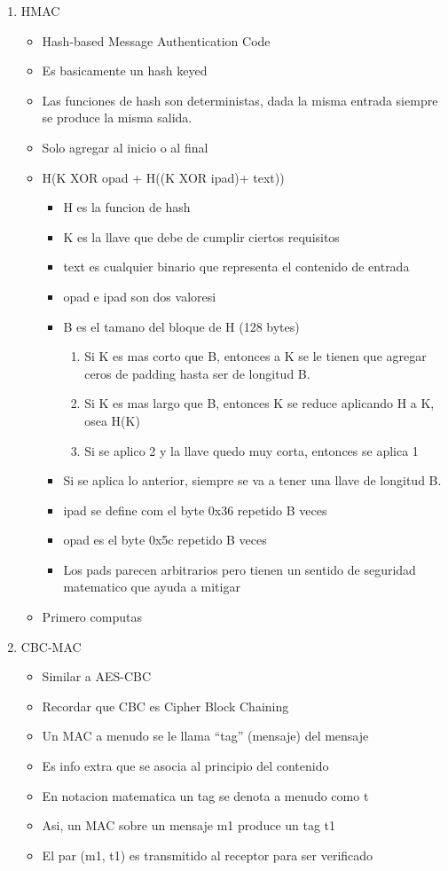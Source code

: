 \documentclass[11pt]{article}
\begin{document}
\begin{enumerate}
\item HMAC
\label{sec:orgefba13e}
\begin{itemize}
\item Hash-based Message Authentication Code
\item Es basicamente un hash keyed
\item Las funciones de hash son deterministas, dada la misma entrada siempre se produce la misma salida.
\item Solo agregar al inicio o al final
\item H(K XOR opad + H((K XOR ipad)+ text))
\begin{itemize}
\item H es la funcion de hash
\item K es la llave que debe de cumplir ciertos requisitos
\item text es cualquier binario que representa el contenido de entrada
\item opad e ipad son dos valoresi
\item B es el tamano del bloque de H (128 bytes)
\begin{enumerate}
\item Si K es mas corto que B, entonces a K se le tienen que agregar ceros de padding hasta ser de longitud B.
\item Si K es mas largo que B, entonces K se reduce aplicando H a K, osea H(K)
\item Si se aplico 2 y la llave quedo muy corta, entonces se aplica 1
\end{enumerate}
\item Si se aplica lo anterior, siempre se va a tener una llave de longitud B.
\item ipad se define com el byte 0x36 repetido B veces
\item opad es el byte 0x5c repetido B veces
\item Los pads parecen arbitrarios pero tienen un sentido de seguridad matematico que ayuda a mitigar
\end{itemize}
\item Primero computas
\end{itemize}
\item CBC-MAC
\label{sec:org2fd3a68}
\begin{itemize}
\item Similar a AES-CBC
\item Recordar que CBC es Cipher Block Chaining
\item Un MAC a menudo se le llama ``tag'' (mensaje) del mensaje
\item Es info extra que se asocia al principio del contenido
\item En notacion matematica un tag se denota a menudo como t
\item Asi, un MAC sobre un mensaje m1 produce un tag t1
\item El par (m1, t1) es transmitido al receptor para ser verificado


\end{itemize}
\end{enumerate}
\end{document}
